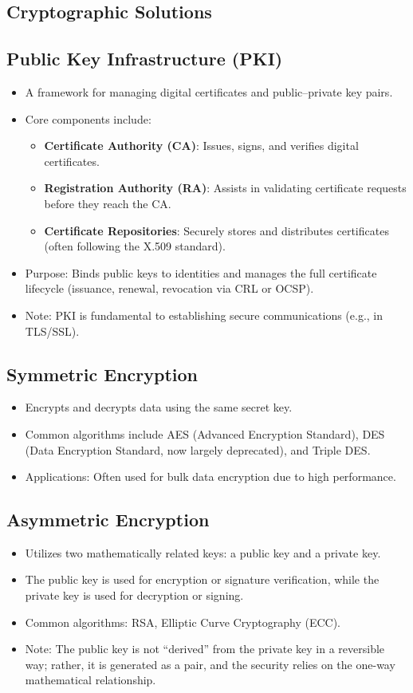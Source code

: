 \documentclass[11pt]{article}
\begin{document}
\subsection{Cryptographic Solutions}
\label{sec:orgdc78535}
\subsection{Public Key Infrastructure (PKI)}
\label{sec:orga591b3f}
\begin{itemize}
\item A framework for managing digital certificates and public–private key pairs.
\item Core components include:
\begin{itemize}
\item \textbf{\textbf{Certificate Authority (CA)}}: Issues, signs, and verifies digital certificates.
\item \textbf{\textbf{Registration Authority (RA)}}: Assists in validating certificate requests before they reach the CA.
\item \textbf{\textbf{Certificate Repositories}}: Securely stores and distributes certificates (often following the X.509 standard).
\end{itemize}
\item Purpose: Binds public keys to identities and manages the full certificate lifecycle (issuance, renewal, revocation via CRL or OCSP).
\item Note: PKI is fundamental to establishing secure communications (e.g., in TLS/SSL).
\end{itemize}
\subsection{Symmetric Encryption}
\label{sec:orgea3ebae}
\begin{itemize}
\item Encrypts and decrypts data using the same secret key.
\item Common algorithms include AES (Advanced Encryption Standard), DES (Data Encryption Standard, now largely deprecated), and Triple DES.
\item Applications: Often used for bulk data encryption due to high performance.
\end{itemize}
\subsection{Asymmetric Encryption}
\label{sec:orgb719d22}
\begin{itemize}
\item Utilizes two mathematically related keys: a public key and a private key.
\item The public key is used for encryption or signature verification, while the private key is used for decryption or signing.
\item Common algorithms: RSA, Elliptic Curve Cryptography (ECC).
\item Note: The public key is not ``derived'' from the private key in a reversible way; rather, it is generated as a pair, and the security relies on the one-way mathematical relationship.
\end{itemize}
\end{document}
